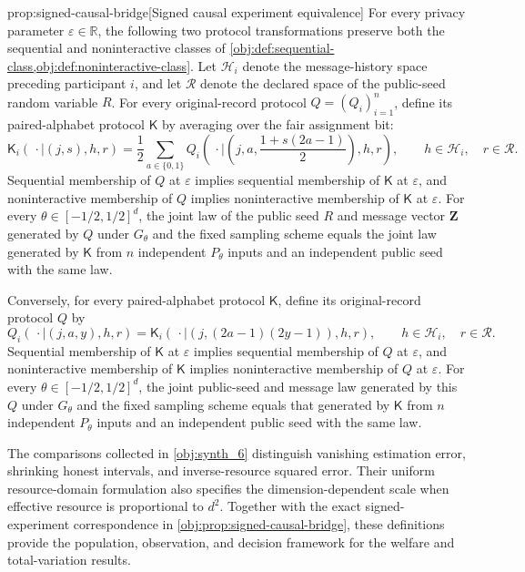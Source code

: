 \begin{propositionv}{prop:signed-causal-bridge}[Signed causal experiment equivalence]
For every privacy parameter \(\varepsilon\in\mathbb R\), the following two protocol transformations preserve both the sequential and noninteractive classes of \cref{obj:def:sequential-class,obj:def:noninteractive-class}. Let \(\mathcal H_i\) denote the message-history space preceding participant \(i\), and let \(\mathcal R\) denote the declared space of the public-seed random variable \(R\). For every original-record protocol \(Q=(Q_i)_{i=1}^n\), define its paired-alphabet protocol \(\mathsf K\) by averaging over the fair assignment bit:
\[
\mathsf K_i(\,\cdot\mid(j,s),h,r)
=
\frac12\sum_{a\in\{0,1\}}
Q_i\!\left(
\,\cdot\mid
\left(j,a,\frac{1+s(2a-1)}2\right),h,r
\right),
\qquad
h\in\mathcal H_i,\quad r\in\mathcal R.
\]
Sequential membership of \(Q\) at \(\varepsilon\) implies sequential membership of \(\mathsf K\) at \(\varepsilon\), and noninteractive membership of \(Q\) implies noninteractive membership of \(\mathsf K\) at \(\varepsilon\). For every \(\theta\in[-1/2,1/2]^d\), the joint law of the public seed \(R\) and message vector \(\mathbf Z\) generated by \(Q\) under \(G_\theta\) and the fixed sampling scheme equals the joint law generated by \(\mathsf K\) from \(n\) independent \(P_\theta\) inputs and an independent public seed with the same law.

Conversely, for every paired-alphabet protocol \(\mathsf K\), define its original-record protocol \(Q\) by
\[
Q_i(\,\cdot\mid(j,a,y),h,r)
=
\mathsf K_i(\,\cdot\mid(j,(2a-1)(2y-1)),h,r),
\qquad
h\in\mathcal H_i,\quad r\in\mathcal R.
\]
Sequential membership of \(\mathsf K\) at \(\varepsilon\) implies sequential membership of \(Q\) at \(\varepsilon\), and noninteractive membership of \(\mathsf K\) implies noninteractive membership of \(Q\) at \(\varepsilon\). For every \(\theta\in[-1/2,1/2]^d\), the joint public-seed and message law generated by this \(Q\) under \(G_\theta\) and the fixed sampling scheme equals that generated by \(\mathsf K\) from \(n\) independent \(P_\theta\) inputs and an independent public seed with the same law.
\end{propositionv}

The comparisons collected in \cref{obj:synth_6} distinguish vanishing estimation error, shrinking honest intervals, and inverse-resource squared error. Their uniform resource-domain formulation also specifies the dimension-dependent scale when effective resource is proportional to \(d^2\). Together with the exact signed-experiment correspondence in \cref{obj:prop:signed-causal-bridge}, these definitions provide the population, observation, and decision framework for the welfare and total-variation results.
